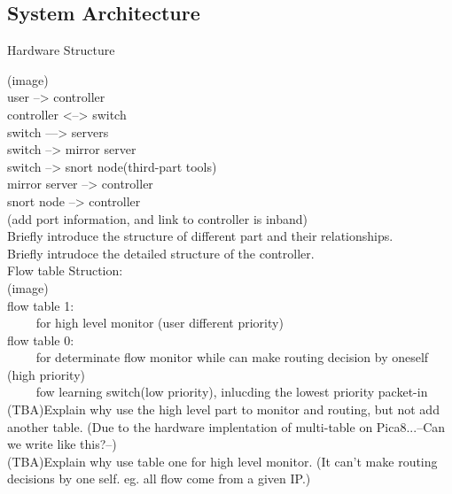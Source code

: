\documentclass{acm_proc_article-sp}
\begin{document}
\subsection{System Architecture}
Hardware Structure

(image)\\
             user --> controller\\
             controller <--> switch\\
             switch ---> servers\\
             switch --> mirror server\\
             switch --> snort node(third-part tools)\\
             mirror server --> controller\\
             snort node --> controller\\
             (add port information, and link to controller is inband)\\


Briefly introduce the structure of different part and their relationships.\\
Briefly intrudoce the detailed structure of the controller.\\
Flow table Struction:\\
(image)\\
            flow table 1:\\
            ~~~~ for high level monitor (user different priority)\\
            flow table 0:\\
            ~~~~ for determinate flow monitor while can make routing decision by oneself (high priority)\\
            ~~~~ fow learning switch(low priority), inlucding the lowest priority packet-in\\

(TBA)Explain why use the high level part to monitor and routing, but not add another table. (Due to the hardware implentation of multi-table on Pica8...--Can we write like this?--)\\
(TBA)Explain why use table one for high level monitor. (It can't make routing decisions by one self. eg. all flow come from a given IP.)\\
\end{document}
